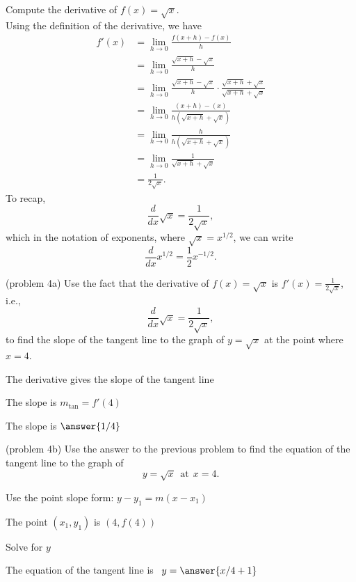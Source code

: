 \documentclass[handout]{ximera}
\begin{document}
\begin{example}[example 4]
Compute the derivative of $f(x) = \sqrt x$.\\
Using the definition of the derivative, we have
\begin{align*}
f'(x) &= \lim_{h \to 0} \frac{f(x+h)-f(x)}{h}\\[5pt]
&= \lim_{h \to 0} \frac{\sqrt{x+h}- \sqrt x}{h}\\[5pt]
&= \lim_{h \to 0} \frac{\sqrt{x+h}- \sqrt x}{h} \cdot \frac{\sqrt{x+h}+ \sqrt x}{\sqrt{x+h}+ \sqrt x} \\[5pt]
&= \lim_{h \to 0} \frac{(x+h) - (x)}{h(\sqrt{x+h}+ \sqrt x)}\\[5pt]
&= \lim_{h \to 0} \frac{h}{h(\sqrt{x+h}+ \sqrt x)}\\[5pt]
&= \lim_{h \to 0} \frac{1}{\sqrt{x+h}+ \sqrt x}\\[5pt]
&=  \frac{1}{2 \sqrt x}.
\end{align*}
To recap, 
\[
\frac{d}{dx}\sqrt{x} = \frac{1}{2\sqrt{x}},
\]
which in the notation of exponents, where $\sqrt x = x^{1/2}$, we can write
\[
\frac{d}{dx}x^{1/2} = \frac12 x^{-1/2}.
\]

\end{example}





\begin{problem}(problem 4a)
Use the fact that the derivative of $f(x) = \sqrt{x}$ is $f'(x) = \frac{1}{2\sqrt{x}}$,
i.e., 
\[
\frac{d}{dx}\sqrt{x} = \frac{1}{2\sqrt{x}},
\]
to find the slope of the tangent line to the graph of 
$y = \sqrt{x}$ at the point where $x = 4$.\\
\begin{hint}
The derivative gives the slope of the tangent line
\end{hint}
\begin{hint}
The slope is $m_{\text{tan}} = f'(4)$
\end{hint}
The slope is $\answer{1/4}$
\end{problem}




\begin{problem}(problem 4b)
Use the answer to the previous problem to find the equation of the tangent line to the graph of 
\[
y = \sqrt{x} \ \ \text{at} \ \ x=4.
\]
\begin{hint}
Use the point slope form: $y-y_1 = m(x-x_1)$
\end{hint}
\begin{hint}
The point $(x_1,y_1)$ is $(4, f(4))$
\end{hint}
\begin{hint}
Solve for $y$
\end{hint}
The equation of the tangent line is \ $y = \answer{x/4 +1}$
\end{problem}
\end{document}
